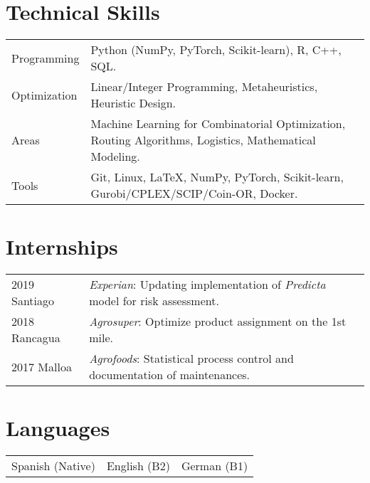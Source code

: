 \documentclass[10pt, a4paper]{article}
\begin{document}
\section*{Technical Skills}
\begin{tabular}{@{} p{} p{} @{}}
    Programming & Python (NumPy, PyTorch, Scikit-learn), R, C++, SQL. \\
    Optimization & Linear/Integer Programming, Metaheuristics, Heuristic Design.\\
    Areas & Machine Learning for Combinatorial Optimization, Routing Algorithms, Logistics, Mathematical Modeling.\\
    Tools & Git, Linux, \LaTeX, NumPy, PyTorch, Scikit-learn, Gurobi/CPLEX/SCIP/Coin-OR, Docker.\\
\end{tabular}

\section*{Internships}
\begin{tabular}{@{} p{} p{} @{}}
    2019 Santiago & \textit{Experian}: Updating implementation of \textit{Predicta} model for risk assessment.\\
    2018 Rancagua & \textit{Agrosuper}: Optimize product assignment on the 1st mile.\\
    2017 Malloa & \textit{Agrofoods}: Statistical process control and documentation of maintenances.\\
\end{tabular}

\section*{Languages}
\begin{tabular}{@{} p{} p{} p{} @{}}
    \centering
    Spanish (Native) & English (B2) & German (B1) \\
\end{tabular}
\end{document}
